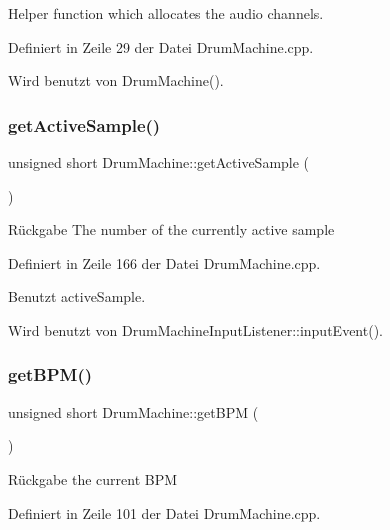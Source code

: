 Helper function which allocates the audio channels. 



Definiert in Zeile 29 der Datei Drum\+Machine.\+cpp.



Wird benutzt von Drum\+Machine().

\mbox{\label{class_drum_machine_ac8ef152a82bbce61bc1e2715c3e476b9}} 
\subsubsection{\texorpdfstring{get\+Active\+Sample()}{getActiveSample()}}
{\footnotesize\ttfamily unsigned short Drum\+Machine\+::get\+Active\+Sample (\begin{DoxyParamCaption}{ }\end{DoxyParamCaption})}

\begin{DoxyReturn}{Rückgabe}
The number of the currently active sample 
\end{DoxyReturn}


Definiert in Zeile 166 der Datei Drum\+Machine.\+cpp.



Benutzt active\+Sample.



Wird benutzt von Drum\+Machine\+Input\+Listener\+::input\+Event().

\mbox{\label{class_drum_machine_a9a7a34dca1803071fec5b6687cb98343}} 
\subsubsection{\texorpdfstring{get\+B\+P\+M()}{getBPM()}}
{\footnotesize\ttfamily unsigned short Drum\+Machine\+::get\+B\+PM (\begin{DoxyParamCaption}{ }\end{DoxyParamCaption})}

\begin{DoxyReturn}{Rückgabe}
the current B\+PM 
\end{DoxyReturn}


Definiert in Zeile 101 der Datei Drum\+Machine.\+cpp.



